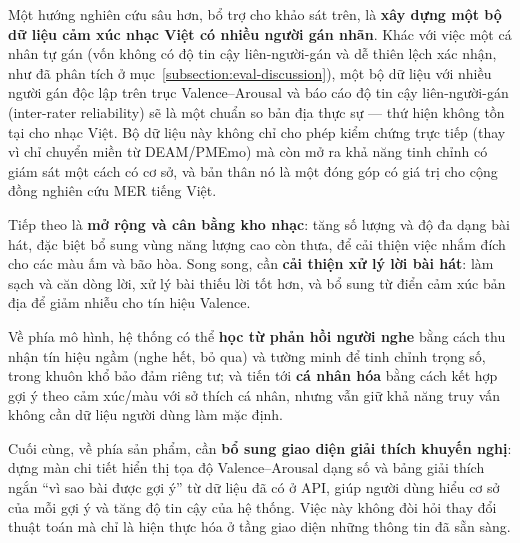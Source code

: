 \documentclass[../DoAn.tex]{subfiles}
\begin{document}
Một hướng nghiên cứu sâu hơn, bổ trợ cho khảo sát trên, là \textbf{xây dựng một bộ dữ liệu cảm xúc nhạc Việt có nhiều người gán nhãn}. Khác với việc một cá nhân tự gán (vốn không có độ tin cậy liên-người-gán và dễ thiên lệch xác nhận, như đã phân tích ở mục~\ref{subsection:eval-discussion}), một bộ dữ liệu với nhiều người gán độc lập trên trục Valence--Arousal và báo cáo độ tin cậy liên-người-gán (inter-rater reliability) sẽ là một chuẩn so bản địa thực sự --- thứ hiện không tồn tại cho nhạc Việt. Bộ dữ liệu này không chỉ cho phép kiểm chứng trực tiếp (thay vì chỉ chuyển miền từ DEAM/PMEmo) mà còn mở ra khả năng tinh chỉnh có giám sát một cách có cơ sở, và bản thân nó là một đóng góp có giá trị cho cộng đồng nghiên cứu MER tiếng Việt.

Tiếp theo là \textbf{mở rộng và cân bằng kho nhạc}: tăng số lượng và độ đa dạng bài hát, đặc biệt bổ sung vùng năng lượng cao còn thưa, để cải thiện việc nhắm đích cho các màu ấm và bão hòa. Song song, cần \textbf{cải thiện xử lý lời bài hát}: làm sạch và căn dòng lời, xử lý bài thiếu lời tốt hơn, và bổ sung từ điển cảm xúc bản địa để giảm nhiễu cho tín hiệu Valence.

Về phía mô hình, hệ thống có thể \textbf{học từ phản hồi người nghe} bằng cách thu nhận tín hiệu ngầm (nghe hết, bỏ qua) và tường minh để tinh chỉnh trọng số, trong khuôn khổ bảo đảm riêng tư; và tiến tới \textbf{cá nhân hóa} bằng cách kết hợp gợi ý theo cảm xúc/màu với sở thích cá nhân, nhưng vẫn giữ khả năng truy vấn không cần dữ liệu người dùng làm mặc định.

Cuối cùng, về phía sản phẩm, cần \textbf{bổ sung giao diện giải thích khuyến nghị}: dựng màn chi tiết hiển thị tọa độ Valence--Arousal dạng số và bảng giải thích ngắn ``vì sao bài được gợi ý'' từ dữ liệu đã có ở API, giúp người dùng hiểu cơ sở của mỗi gợi ý và tăng độ tin cậy của hệ thống. Việc này không đòi hỏi thay đổi thuật toán mà chỉ là hiện thực hóa ở tầng giao diện những thông tin đã sẵn sàng.
\end{document}

